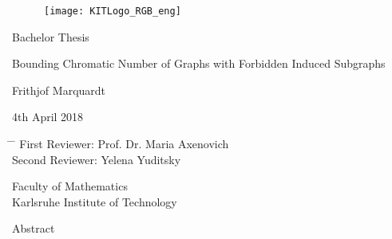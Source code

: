 \documentclass[12pt,a4paper]{scrartcl}
\theoremstyle{plain}
\theoremstyle{definition}
\numberwithin{equation}{section}
\theoremstyle{case}
\begin{document}
  \pagestyle{empty}

  \begin{titlepage}

\begin{figure}[h]
\texttt{[image: KITLogo\_RGB\_eng]} 
\end{figure}
  
    \vspace*{2cm} 

 \begin{center} \large 
    
    Bachelor Thesis
    \vspace*{2cm}

    {\huge Bounding Chromatic Number of Graphs with Forbidden Induced Subgraphs}
    \vspace*{2.5cm}

    Frithjof Marquardt
    \vspace*{1.5cm}

    4th April 2018
    \vspace*{3cm}
  
    \begin{tabbing}
      \hspace*{6em}\= \hspace*{10em} \= \kill %
      \> First Reviewer:\> Prof. Dr. Maria Axenovich
      \\
      \> Second Reviewer:  \> Yelena Yuditsky
      \\[0.5cm]
    \end{tabbing}
      
    Faculty of Mathematics \\[1cm]
  
		Karlsruhe Institute of Technology
  \end{center}
  
\end{titlepage}
\mbox{}
\clearpage

 

\begin{center}
Abstract
\end{center}

  \clearpage
  \mbox{}
  \clearpage
  \tableofcontents

  \clearpage
  \mbox{}
  \clearpage
 


  \pagestyle{headings}
\end{document}
